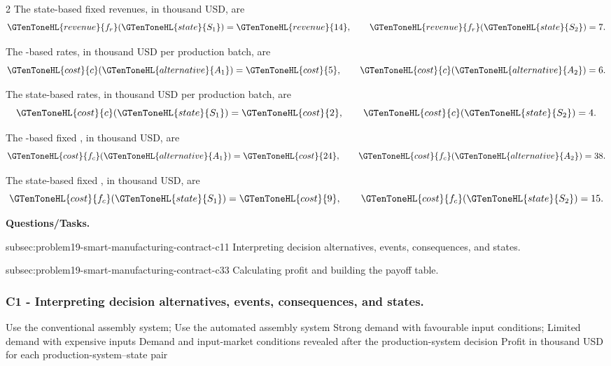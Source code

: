 \begin{multicols}{2}
	The state-based fixed revenues, in thousand USD, are
	\[
	\GTenToneHL{revenue}{f_r}(\GTenToneHL{state}{S_1})=\GTenToneHL{revenue}{14},
	\qquad
	\GTenToneHL{revenue}{f_r}(\GTenToneHL{state}{S_2})=7.
	\]
	
	The -based  rates, in thousand USD per production
	batch, are
	\[
	\GTenToneHL{cost}{c}(\GTenToneHL{alternative}{A_1})=\GTenToneHL{cost}{5},
	\qquad
	\GTenToneHL{cost}{c}(\GTenToneHL{alternative}{A_2})=6.
	\]
	
	The state-based  rates, in thousand USD per production batch, are
	\[
	\GTenToneHL{cost}{c}(\GTenToneHL{state}{S_1})=\GTenToneHL{cost}{2},
	\qquad
	\GTenToneHL{cost}{c}(\GTenToneHL{state}{S_2})=4.
	\]
	
	The -based fixed , in thousand USD, are
	\[
	\GTenToneHL{cost}{f_c}(\GTenToneHL{alternative}{A_1})=\GTenToneHL{cost}{24},
	\qquad
	\GTenToneHL{cost}{f_c}(\GTenToneHL{alternative}{A_2})=38.
	\]
	
	The state-based fixed , in thousand USD, are
	\[
	\GTenToneHL{cost}{f_c}(\GTenToneHL{state}{S_1})=\GTenToneHL{cost}{9},
	\qquad
	\GTenToneHL{cost}{f_c}(\GTenToneHL{state}{S_2})=15.
	\]
\end{multicols}

\textbf{Questions/Tasks.}
\begin{enumerate}
	\CriterionTask
	{subsec:problem19-smart-manufacturing-contract-c1}{1}
	{Interpreting decision alternatives, events, consequences, and states.}

	\CriterionTask
	{subsec:problem19-smart-manufacturing-contract-c3}{3}
	{Calculating profit and building the payoff table.}
\end{enumerate}

\subsubsection*{C1 - Interpreting decision alternatives, events, consequences, and states.}
\label{subsec:problem19-smart-manufacturing-contract-c1}

\DecisionElementsTable
{Use the conventional assembly system; Use the automated assembly system}
{Strong demand with favourable input conditions; Limited demand with expensive inputs}
{Demand and input-market conditions revealed after the production-system decision}
{Profit in thousand USD for each production-system--state pair}

